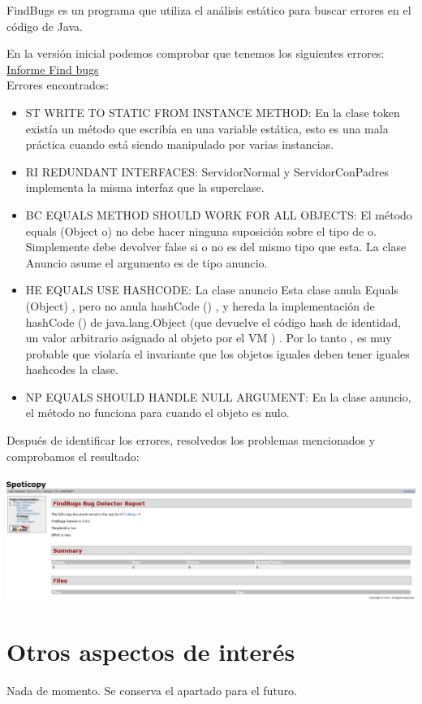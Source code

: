\documentclass[12pt, a4paper, titlepage]{article}
\begin{document}
	FindBugs es un programa que utiliza el análisis estático para buscar errores en el código de Java.
	
	En la versión inicial podemos comprobar que tenemos los siguientes errores:
	\href{Informes/SiteTestInicial/findbugs.html}{Informe Find bugs} \\

	Errores encontrados:
	\begin{itemize}
		\item 	ST WRITE TO STATIC FROM INSTANCE METHOD: En la clase token existía un método que escribía en una variable estática, esto es una mala práctica cuando está siendo manipulado por varias instancias.
		\item 	RI REDUNDANT INTERFACES: ServidorNormal y ServidorConPadres implementa la misma interfaz que la superclase.
		\item BC EQUALS METHOD SHOULD WORK FOR ALL OBJECTS: El método equals (Object o) no debe hacer ninguna suposición sobre el tipo de o. Simplemente debe devolver false si o no es del mismo tipo que esta. La clase Anuncio asume el argumento es de tipo anuncio.
		\item HE EQUALS USE HASHCODE: La clase anuncio Esta clase anula Equals (Object) , pero no anula hashCode () , y hereda la implementación de hashCode () de java.lang.Object (que devuelve el código hash de identidad, un valor arbitrario asignado al objeto por el VM ) . Por lo tanto , es muy probable que violaría el invariante que los objetos iguales deben tener iguales hashcodes la clase.
		\item NP EQUALS SHOULD HANDLE NULL ARGUMENT: En la clase anuncio, el método no funciona para cuando el objeto es nulo.	
	\end{itemize}
	Después de identificar los errores, resolvedos los problemas mencionados y comprobamos el resultado:\\
	\\
	\includegraphics[width=15cm]{Imagenes/FindsBugs2.png} \\

	\section{Otros aspectos de interés}
	
	Nada de momento. Se conserva el apartado para el futuro.
	
\end{document}
